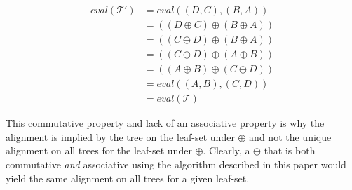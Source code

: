 \documentclass{bmcart}
\begin{document}
\begin{align*}
  eval(\mathcal{T'}) &= eval((D,C),(B,A))
\\  &= ((D \oplus C) \oplus (B \oplus A))
\\  &= ((C \oplus D) \oplus (B \oplus A))
\\  &= ((C \oplus D) \oplus (A \oplus B))
\\  &= ((A \oplus B) \oplus (C \oplus D))
\\  &= eval((A,B),(C,D))
\\  &= eval(\mathcal{T})
\end{align*}

This commutative property and lack of an associative property is why the alignment is implied by the tree on the leaf-set under $\oplus$ and not the unique alignment on all trees for the leaf-set under $\oplus$.
Clearly, a $\oplus$ that is both commutative \emph{and} associative using the algorithm described in this paper would yield the same alignment on all trees for a given leaf-set.

%

\end{document}
